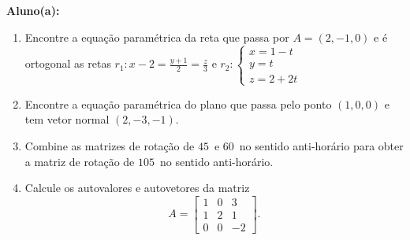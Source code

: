 \documentclass[a4paper,5pt]{amsbook}
\newcommand{\ds}{\displaystyle}
\begin{document}
\vspace{0.5cm}
{\bf Aluno(a):}\dotfill{}  %

\vspace{0.2cm}
\begin{enumerate}
	\vspace{0.5cm}
	\item Encontre a equa\c{c}\~ao param\'etrica da reta que passa por $A = (2,-1,0)$ e
		\'e ortogonal as retas $\ds r_1: x-2 = \frac{y+1}{2} = \frac{z}{3}$ e
		$r_2: \left\{\begin{array}{lll}
				x = 1-t \\
				y = t \\
				z = 2+2t
			\end{array}\right.$

	\vspace{0.5cm}
	\item Encontre a equa\c{c}\~ao param\'etrica do plano que passa pelo ponto
		$(1, 0, 0)$ e tem vetor normal $(2, -3, -1)$.

	\vspace{0.5cm}
	\item Combine as matrizes de rota\c{c}\~ao de $45$\textdegree\ e $60$\textdegree\ no
		sentido anti-hor\'ario para obter a matriz de rota\c{c}\~ao de $105$\textdegree\ no
		sentido anti-hor\'ario.

	\vspace{0.5cm}
	\item Calcule os autovalores e autovetores da matriz
		\[A = \left[\begin{array}{rrr}
			1 & 0 & 3 \\
			1 & 2 & 1 \\
			0 & 0 & -2
		\end{array}\right].\]


\end{enumerate}
\end{document}
